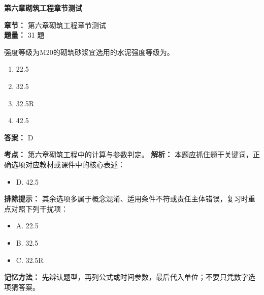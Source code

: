 \documentclass[UTF8,fontset=fandol,11pt]{ctexart}
\newcommand{\chaptertitle}[1]{\vspace{0.5em}\begin{tcolorbox}[enhanced,colback=deepblue,colframe=deepblue,arc=2mm,boxrule=0pt]\begin{center}\Large\bfseries\color{white}#1\end{center}\end{tcolorbox}\vspace{0.5em}}
\begin{document}
\vspace{0.2em}

\chaptertitle{第六章砌筑工程章节测试}
\begin{mainbox}
\textbf{\textcolor{mainblue}{章节：}} 第六章砌筑工程章节测试\\
\textbf{\textcolor{answerred}{题量：}} 31 题
\end{mainbox}

\begin{quizbox}[title={第 1 题}]
强度等级为M20的砌筑砂浆宜选用的水泥强度等级为。\\
\begin{enumerate}[label=\Alph*.]
\item 22.5
\item 32.5
\item 32.5R
\item 42.5
\end{enumerate}
\textbf{答案：} D
\vspace{0.25em}
\begin{answerbox}[title={考点解析}]
\textbf{考点：} 第六章砌筑工程中的计算与参数判定。
\textbf{解析：} 本题应抓住题干关键词，正确选项对应教材或课件中的核心表述：
\begin{itemize}
\item D. 42.5
\end{itemize}
\textbf{排除提示：} 其余选项多属于概念混淆、适用条件不符或责任主体错误，复习时重点对照下列干扰项：
\begin{itemize}
\item A. 22.5
\item B. 32.5
\item C. 32.5R
\end{itemize}
\textbf{记忆方法：} 先辨认题型，再列公式或时间参数，最后代入单位；不要只凭数字选项猜答案。
\end{answerbox}
\end{quizbox}

\vspace{0.2em}
\end{document}
